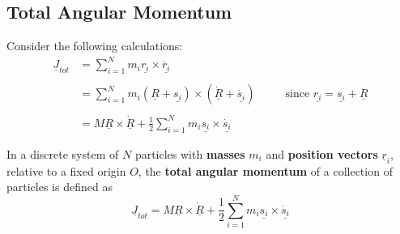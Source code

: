 \subsection{Total Angular Momentum}

Consider the following calculations:
\begin{align*}
	\underline{J}_{tot} & = \sum_{i=1}^{N}m_{i} \underline{r_i} \times \underline{\dot{r_i}}                                                                                                                                  \\ \\
	                    & = \sum_{i=1}^{N}m_{i}(\underline{R} + \underline{s_i}) \times (\underline{\dot{R}} + \underline{\dot{s_i}}) \ \ \ \ \ \ \ \ \ \ \ \ \text{since } \underline{r_i} = \underline{s_i} + \underline{R} \\ \\
	                    & = M \underline{R} \times \underline{\dot{R}} + \frac{1}{2}\sum_{i=1}^{N}m_{i}\underline{s_{i}} \times \underline{\dot{s_{i}}}
\end{align*}

\begin{definition}
	\label{def:total-angular-momentum}
	In a discrete system of $N$ particles with {\bf masses} $m_i$ and {\bf position vectors} $\underline{r}_i$, relative to a fixed origin $O$, the {\bf total angular momentum} of a collection of particles is defined as
	\begin{equation}
		\label{eq:total-angular-momentum}
		\underline{J}_{tot} = M \underline{R} \times \underline{\dot{R}} + \frac{1}{2}\sum_{i=1}^{N}m_{i}\underline{s_{i}} \times \underline{\dot{s_{i}}}
	\end{equation}
\end{definition}
